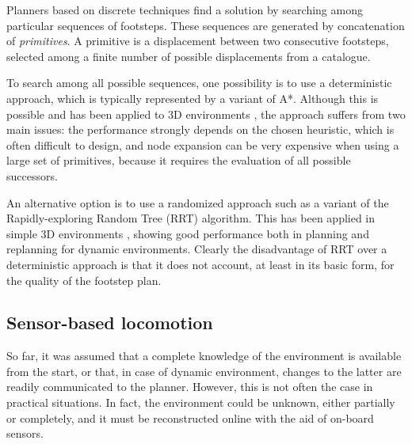 Planners based on discrete techniques find a solution by searching among particular sequences of footsteps. These sequences are generated by concatenation of \emph{primitives}. A primitive is a displacement between two consecutive footsteps, selected among a finite number of possible displacements from a catalogue.

To search among all possible sequences, one possibility is to use a deterministic approach, which is typically represented by a variant of A*. Although this is possible and has been applied to 3D environments \cite{Griffin2019ICRA}, the approach suffers from two main issues: the performance strongly depends on the chosen heuristic, which is often difficult to design, and node expansion can be very expensive when using a large set of primitives, because it requires the evaluation of all possible successors.

An alternative option is to use a randomized approach such as a variant of the Rapidly-exploring Random Tree (RRT) algorithm. 
This has been applied in simple 3D environments \cite{Liu2012IROS}, showing good performance both in planning and replanning for dynamic environments. Clearly the disadvantage of RRT over a deterministic approach is that it does not account, at least in its basic form, for the quality of the footstep plan.

\subsection{Sensor-based locomotion}
So far, it was assumed that a complete knowledge of the environment is available from the start, or that, in case of dynamic environment, changes to the latter are readily communicated to the planner. However, this is not often the case in practical situations. In fact, the environment could be unknown, either partially or completely, and it must be reconstructed online with the aid of on-board sensors.


